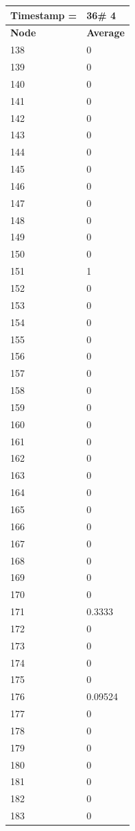 \begin{tabular}{|l||l|}
\hline
\textbf{Timestamp =} & \textbf{36}\# 4\\\hline
	\textbf{Node} & \textbf{Average} \\ \hline
\hline
	138 & 0 \\ \hline
	139 & 0 \\ \hline
	140 & 0 \\ \hline
	141 & 0 \\ \hline
	142 & 0 \\ \hline
	143 & 0 \\ \hline
	144 & 0 \\ \hline
	145 & 0 \\ \hline
	146 & 0 \\ \hline
	147 & 0 \\ \hline
	148 & 0 \\ \hline
	149 & 0 \\ \hline
	150 & 0 \\ \hline
	151 & 1 \\ \hline
	152 & 0 \\ \hline
	153 & 0 \\ \hline
	154 & 0 \\ \hline
	155 & 0 \\ \hline
	156 & 0 \\ \hline
	157 & 0 \\ \hline
	158 & 0 \\ \hline
	159 & 0 \\ \hline
	160 & 0 \\ \hline
	161 & 0 \\ \hline
	162 & 0 \\ \hline
	163 & 0 \\ \hline
	164 & 0 \\ \hline
	165 & 0 \\ \hline
	166 & 0 \\ \hline
	167 & 0 \\ \hline
	168 & 0 \\ \hline
	169 & 0 \\ \hline
	170 & 0 \\ \hline
	171 & 0.3333 \\ \hline
	172 & 0 \\ \hline
	173 & 0 \\ \hline
	174 & 0 \\ \hline
	175 & 0 \\ \hline
	176 & 0.09524 \\ \hline
	177 & 0 \\ \hline
	178 & 0 \\ \hline
	179 & 0 \\ \hline
	180 & 0 \\ \hline
	181 & 0 \\ \hline
	182 & 0 \\ \hline
	183 & 0 \\ \hline
\end{tabular}
